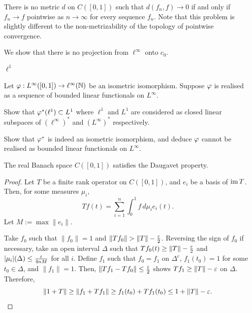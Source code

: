 \documentclass{../../large}
\begin{document}
\begin{prb}
There is no metric $d$ on $C([0,1])$ such that $d(f_n,f)\to0$ if and only if $f_n\to f$ pointwise as $n\to\infty$ for every sequence $f_n$.
Note that this problem is slightly different to the non-metrizability of the topology of pointwise convergence.
\end{prb}

\begin{prb}
We show that there is no projection from $\ell^\infty$ onto $c_0$.
\end{prb}

\begin{prb}
$\ell^1$
\end{prb}

\begin{prb}
Let $\varphi:L^\infty([0,1])\to\ell^\infty(\mathbb{N})$ be an isometric isomorphism.
Suppose $\varphi$ is realised as a sequence of bounded linear functionals on $L^\infty$.
\begin{parts}
\item
Show that $\varphi^*(\ell^1)\subset L^1$ where $\ell^1$ and $L^1$ are considered as closed linear subspaces of $(\ell^\infty)^*$ and $(L^\infty)^*$ respectively.
\item Show that $\varphi^*$ is indeed an isometric isomorphism, and deduce $\varphi$ cannot be realised as bounded linear functionals on $L^\infty$.
\end{parts}
\end{prb}


\begin{prb}
\begin{parts}
\item The real Banach space $C([0,1])$ satisfies the Daugavet property.
\end{parts}
\end{prb}
\begin{proof}
Let $T$ be a finite rank operator on $C([0,1])$, and $e_i$ be a basis of $\operatorname{im} T$.
Then, for some measures $\mu_i$,
\[Tf(t)=\sum_{i=1}^n\int_0^1f\,d\mu_ie_i(t).\]
Let $M:=\max\|e_i\|$.

Take $f_0$ such that $\|f_0\|=1$ and $\|Tf_0\|>\|T\|-\frac\e2$.
Reversing the sign of $f_0$ if necessary, take an open interval $\Delta$ such that $Tf_0(t)\ge\|T\|-\frac{\varepsilon}2$ and $|\mu_i|(\Delta)\le\frac{\varepsilon}{4nM}$ for all $i$.
Define $f_1$ such that $f_0=f_1$ on $\Delta^c$, $f_1(t_0)=1$ for some $t_0\in\Delta$, and $\|f_1\|=1$.
Then, $\|Tf_1-Tf_0\|\le\frac{\varepsilon}2$ shows $Tf_1\ge\|T\|-\varepsilon$ on $\Delta$.
Therefore,
\[\|1+T\|\ge\|f_1+Tf_1\|\ge f_1(t_0)+Tf_1(t_0)\le1+\|T\|-\varepsilon.\]
\end{proof}
\end{document}
